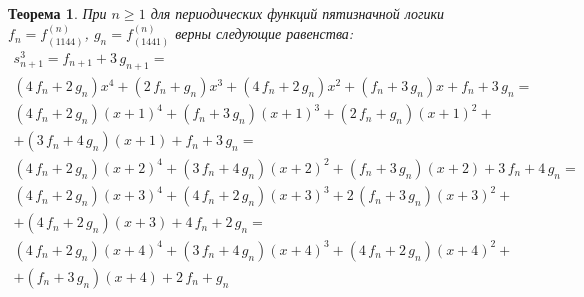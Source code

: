 \documentclass[bibliography=totoc, a4paper, 14pt]{extarticle}
\newtheorem{myth}{Теорема}
\begin{document}
\begin{myth} При $n \geqslant 1 $ для периодических функций пятизначной логики $f_n = f^{\left(n\right)}_{\left(1144\right)}$,
$g_n = f^{\left(n\right)}_{\left(1441\right)}$ верны следующие равенства:
$$\begin{array}{l}
s_{n+1}^3 = f_{n+1} + 3\,g_{n+1}=\\
 {\left(4 \, f_{n} + 2 \, g_{n}\right)} x^{4} + {\left(2 \, f_{n} + g_{n}\right)} x^{3} + {\left(4 \, f_{n} + 2 \, g_{n}\right)} x^{2} + {\left(f_{n} + 3 \, g_{n}\right)} x + f_{n} + 3 \, g_{n} =\\
 {\left(4 \, f_{n} + 2 \, g_{n}\right)} {\left(x + 1\right)}^{4} + {\left(f_{n} + 3 \, g_{n}\right)} {\left(x + 1\right)}^{3} + {\left(2 \, f_{n} + g_{n}\right)} {\left(x + 1\right)}^{2} +\\
 + {\left(3 \, f_{n} + 4 \, g_{n}\right)} {\left(x + 1\right)} + f_{n} + 3 \, g_{n} =\\
 {\left(4 \, f_{n} + 2 \, g_{n}\right)} {\left(x + 2\right)}^{4} + {\left(3 \, f_{n} + 4 \, g_{n}\right)} {\left(x + 2\right)}^{2} + {\left(f_{n} + 3 \, g_{n}\right)} {\left(x + 2\right)} + 3 \, f_{n} + 4 \, g_{n} =\\
 {\left(4 \, f_{n} + 2 \, g_{n}\right)} {\left(x + 3\right)}^{4} + {\left(4 \, f_{n} + 2 \, g_{n}\right)} {\left(x + 3\right)}^{3} + 2 \, {\left(f_{n} + 3 \, g_{n}\right)} {\left(x + 3\right)}^{2} +\\
 + {\left(4 \, f_{n} + 2 \, g_{n}\right)} {\left(x + 3\right)} + 4 \, f_{n} + 2 \, g_{n} =\\
 {\left(4 \, f_{n} + 2 \, g_{n}\right)} {\left(x + 4\right)}^{4} + {\left(3 \, f_{n} + 4 \, g_{n}\right)} {\left(x + 4\right)}^{3} + {\left(4 \, f_{n} + 2 \, g_{n}\right)} {\left(x + 4\right)}^{2} +\\
 + {\left(f_{n} + 3 \, g_{n}\right)} {\left(x + 4\right)} + 2 \, f_{n} + g_{n}\\
 \end{array}$$
\end{myth}
\end{document}
